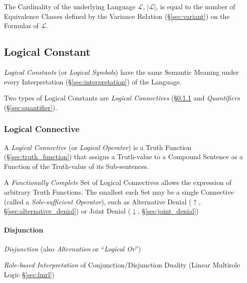 The Cardinality of the underlying Language $\mathcal{L}$,
$|\mathcal{L}|$, is equal to the number of Equivalence Classes defined
by the Variance Relation (\S\ref{sec:variant}) on the Formulas of
$\mathcal{L}$.



\subsection{Logical Constant}\label{sec:logical_constant}

\emph{Logical Constants} (or \emph{Logical Symbols}) have the same
Semantic Meaning under every Interpretation
(\S\ref{sec:interpretation}) of the Language.

Two types of Logical Constants are \emph{Logical Connectives}
(\S\ref{sec:logical_connective} and \emph{Quantifiers}
(\S\ref{sec:quantifier}).



\subsubsection{Logical Connective}\label{sec:logical_connective}

A \emph{Logical Connective} (or \emph{Logical Operator}) is a Truth
Function (\S\ref{sec:truth_function}) that assigns a Truth-value to a
Compound Sentence as a Function of the Truth-value of its
Sub-sentences.

A \emph{Functionally Complete} Set of Logical Connectives allows the
expression of arbitrary Truth Functions. The smallest such Set may be
a single Connective (called a \emph{Sole-sufficient Operator}), such
as Alternative Denial ($\uparrow$, \S\ref{sec:alternative_denial}) or
Joint Denial ($\downarrow$, \S\ref{sec:joint_denial})



\paragraph{Disjunction}\label{sec:disjunction}\hfill

\emph{Disjunction} (also \emph{Alternation} or ``\emph{Logical Or}'')

\fist \emph{Role-based Interpretation} of Conjunction/Disjunction
Duality (Linear Multirole Logic \S\ref{sec:lmrl})



